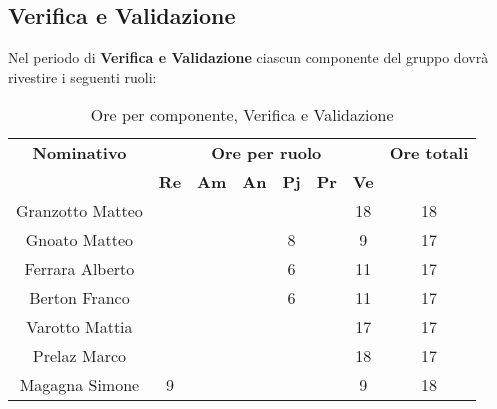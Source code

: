 \subsection{Verifica e Validazione}
Nel periodo di \textbf{Verifica e Validazione} ciascun componente del gruppo dovrà rivestire i seguenti ruoli:
\begin{table}[H]
	\begin{center}
		\begin{tabular}{|c|c|c|c|c|c|c|c|}
			\hline
			\textbf{Nominativo} & \multicolumn{6}{c|}{\textbf{Ore per ruolo}} & \textbf{Ore totali} \\
			& \textbf{Re} & \textbf{Am} & \textbf{An} & \textbf{Pj} & \textbf{Pr} & \textbf{Ve} & \\
			\hline
			Granzotto Matteo	&		&	 	&		&		&	 	& 	18	&	18	\\
			\hline
			Gnoato Matteo		&		&		&		&	8	&		&	9	&	17	\\
			\hline
			Ferrara Alberto		&		&		&		&	 6	&		&	11	& 	17	\\
			\hline
			Berton Franco		&		&		&		&	6	&		&	11	&	17	\\
			\hline
			Varotto Mattia 		&		&		&		&		&		&	17	& 	17	\\
			\hline
			Prelaz Marco 		& 		&		&		&		&		&	18	&	17	\\
			\hline
			Magagna Simone 		&	9	&		&		&		&		& 	9	&	18	\\
			\hline
		\end{tabular}
	\end{center}
	\caption{Ore per componente, Verifica e Validazione}
\end{table}
